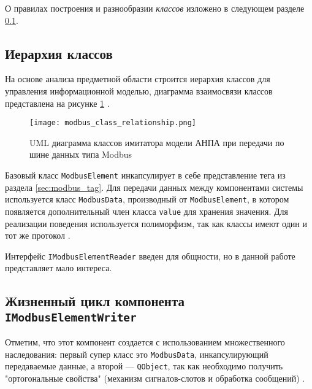 О правилах построения и разнообразии \textit{классов} изложено в следующем разделе \ref{sec:writers_relationship}.


\subsection{Иерархия классов}\label{sec:writers_relationship}
На основе анализа предметной области строится иерархия классов для управления информационной моделью,
диаграмма взаимосвязи классов представлена на рисунке \ref{fig:modbus_class_uml} \cite[стр. 223]{book:oop:oop_analize}.
\begin{landscape}
    \begin{center}
        \begin{figure}[ht!]
            \texttt{[image: modbus\_class\_relationship.png]}
            \caption{UML диаграмма классов имитатора модели АНПА при передачи по шине данных типа Modbus}\label{fig:modbus_class_uml}
        \end{figure}
    \end{center}
\end{landscape}
Базовый класс \texttt{ModbusElement} инкапсулирует в себе представление тега из раздела \ref{sec:modbus_tag}.
Для передачи данных между компонентами системы используется класс \texttt{ModbusData}, производный от \texttt{ModbusElement},
в котором появляется дополнительный член класса \texttt{value} для хранения значения.
Для реализации поведения используется полиморфизм, так как классы имеют один и тот же протокол \cite[стр. 133]{book:oop:oop_analize}.



Интерфейс \texttt{IModbusElementReader} введен для общности,
но в данной работе представляет мало интереса.


\subsection{Жизненный цикл компонента \texttt{IModbusElementWriter}}
Отметим, что этот компонент создается с использованием множественного наследования:
первый супер класс это \texttt{ModbusData}, инкапсулирующий передаваемые данные,
а второй --- \texttt{QObject}, так как необходимо получить "ортогональные свойства"
(механизм сигналов-слотов и обработка сообщений) \cite[стр. 134]{book:oop:oop_analize}.

